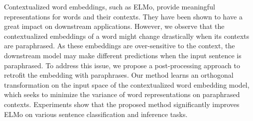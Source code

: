 Contextualized word embeddings, such as ELMo,  provide meaningful representations for words and their contexts. They have been shown to have a great impact on downstream applications. However, we observe that the contextualized embeddings of a word might change drastically when its contexts are paraphrased. As these embeddings are over-sensitive to the context, the downstream model may make different predictions when the input sentence is paraphrased. To address this issue, we propose a post-processing approach to retrofit the embedding with paraphrases. Our method learns an orthogonal transformation on the input space of the contextualized word embedding model, which seeks to minimize the variance of word representations on paraphrased contexts. Experiments show that the proposed method significantly improves ELMo on various sentence classification and inference tasks.